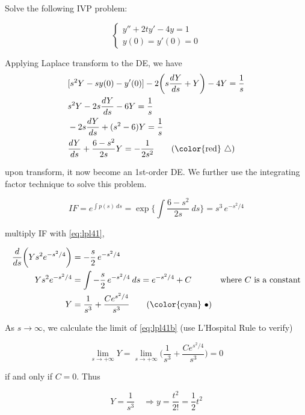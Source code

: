 \begin{example}
    Solve the following IVP problem:
    
    \[
        \begin{cases}
            y'' + 2ty' - 4y = 1\\
            y(0) = y'(0) = 0
        \end{cases}
    \]
\end{example}
\begin{solution}
    Applying Laplace transform to the DE, we have
    \begin{align*}
        &[s^2Y - sy(0) - y'(0)] - 2\biggl(s\frac{dY}{ds} + Y \biggr) - 4Y = \frac{1}{s}\\
        &s^2Y - 2s\frac{dY}{ds} - 6Y = \frac{1}{s}\\
        &-2s \frac{dY}{ds} + (s^2 - 6)Y = \frac{1}{s}\\
        &\frac{dY}{ds} + \frac{6-s^2}{2s} Y = - \frac{1}{2s^2} \label{eq:lpl41} \tag{{\color{red} $\bigtriangleup$}}
    \end{align*}

    upon transform, it now become an 1st-order DE. We further use the integrating factor technique 
    to solve this problem.

    \[
    IF = e^{\int p(s)\> ds} = \exp \biggl\{\int \frac{6 - s^2}{2s}\> ds \biggr\} = s^3\, e^{-s^2/4}
    \]

    multiply IF with \eqref{eq:lpl41},

    \begin{align*}
        \frac{d}{ds} \biggl(Ys^2 e^{-s^2/4}\biggr) &= -\frac{s}{2}\, e^{-s^2/4}\\
        Ys^2 e^{-s^2/4} &= \int -\frac{s}{2}\, e^{-s^2/4} \> ds = e^{-s^2/4} + C & \text{where } C \text{ is a constant}\\
        Y &= \frac{1}{s^3} + \frac{Ce^{s^2/4}}{s^3} \label{eq:lpl41b} \tag{{\color{cyan} $\bullet$}}
    \end{align*}

    As $s \to \infty$, we calculate the limit of \eqref{eq:lpl41b} (use L'Hospital Rule to verify)

    \[
        \lim_{s \to +\infty} Y = \lim_{s \to +\infty} \biggl(\frac{1}{s^3} + \frac{Ce^{s^2/4}}{s^3}\biggr) = 0
    \]

    if and only if $C = 0$. Thus

    \[
        Y = \frac{1}{s^3} \quad \Rightarrow y = \frac{t^2}{2!} = \frac{1}{2}t^2
    \]

\end{solution}

